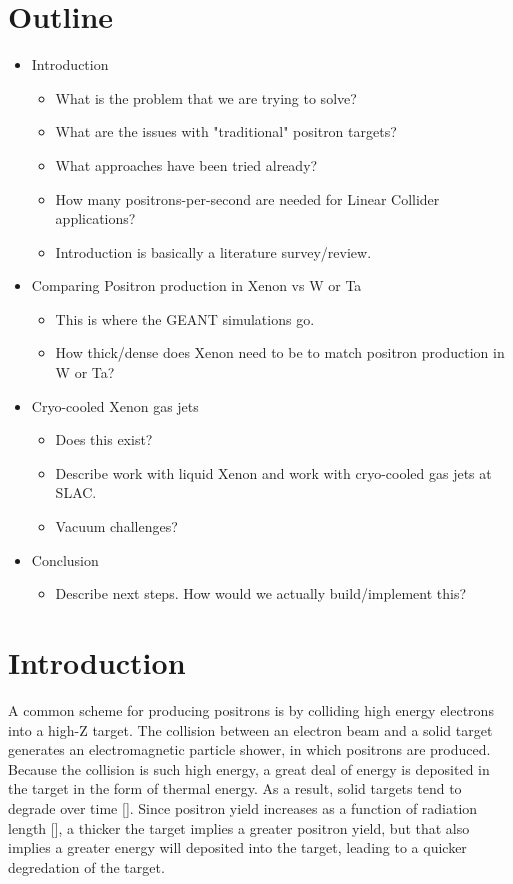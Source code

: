 \documentclass[%
reprint,
amsmath, amssymb,
aps,
floatfix,
]{revtex4-2}
\begin{document}
\section{Outline}
\begin{itemize}
    \item Introduction
    \begin{itemize}
        \item What is the problem that we are trying to solve?
        \item What are the issues with "traditional" positron targets?
        \item What approaches have been tried already?
        \item How many positrons-per-second are needed for Linear Collider applications?
        \item Introduction is basically a literature survey/review.
    \end{itemize}
    \item Comparing Positron production in Xenon vs W or Ta
    \begin{itemize}
        \item This is where the GEANT simulations go.
        \item How thick/dense does Xenon need to be to match positron production in W or Ta?
    \end{itemize}
    \item Cryo-cooled Xenon gas jets
    \begin{itemize}
        \item Does this exist?
        \item Describe work with liquid Xenon and work with cryo-cooled gas jets at SLAC.
        \item Vacuum challenges?
    \end{itemize}
    \item Conclusion
    \begin{itemize}
        \item Describe next steps. How would we actually build/implement this?
    \end{itemize}
    
\end{itemize}

\section{Introduction}
A common scheme for producing positrons is by colliding high energy electrons into a high-Z target.
The collision between an electron beam and a solid target generates an electromagnetic particle shower,
in which positrons are produced.
Because the collision is such high energy, a great deal of energy is deposited in the target in the form of
thermal energy.  As a result, solid targets tend to degrade over time [].  Since positron yield increases as a
function of radiation length [], a thicker the target implies a greater positron yield, but that also implies
a greater energy will deposited into the target, leading to a quicker degredation of the target.
\end{document}
